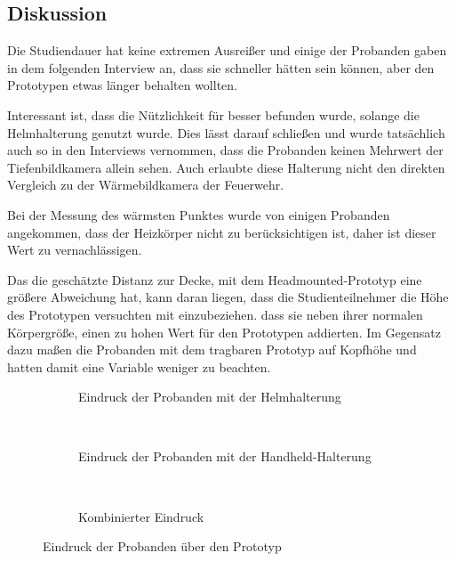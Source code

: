 \subsection{Diskussion}
Die Studiendauer hat keine extremen Ausreißer und einige der Probanden gaben in dem folgenden Interview an, dass sie schneller hätten sein können, aber den Prototypen etwas länger behalten wollten.

Interessant ist, dass die Nützlichkeit für besser befunden wurde, solange die Helmhalterung genutzt wurde.
Dies lässt darauf schließen und wurde tatsächlich auch so in den Interviews vernommen, dass die Probanden keinen Mehrwert der Tiefenbildkamera allein sehen.
Auch erlaubte diese Halterung nicht den direkten Vergleich zu der Wärmebildkamera der Feuerwehr.

Bei der Messung des wärmsten Punktes wurde von einigen Probanden angekommen, dass der Heizkörper nicht zu berücksichtigen ist, daher ist dieser Wert zu vernachlässigen.

Das die geschätzte Distanz zur Decke, mit dem Headmounted-Prototyp eine größere Abweichung hat, kann daran liegen, dass die Studienteilnehmer die Höhe des Prototypen versuchten mit einzubeziehen.
\Dh dass sie neben ihrer normalen Körpergröße, einen zu hohen Wert für den Prototypen addierten.
Im Gegensatz dazu maßen die Probanden mit dem tragbaren Prototyp auf Kopfhöhe und hatten damit eine Variable weniger zu beachten.

\begin{figure}[H]
	\centering
	\begin{subfigure}[t]{0.3\textwidth}
		\centering
		\caption{Eindruck der Probanden mit der Helmhalterung}
		\label{fig:study2_head_impres}
	\end{subfigure}
	~
	\begin{subfigure}[t]{0.3\textwidth}
		\centering
		\caption{Eindruck der Probanden mit der Handheld-Halterung}
		\label{fig:study2_hand_impres}
	\end{subfigure}
	~
	\begin{subfigure}[t]{0.3\textwidth}
		\centering
		\caption{Kombinierter Eindruck}
		\label{fig:study2_both_impres}
	\end{subfigure}
	\caption{Eindruck der Probanden über den Prototyp}
	\label{fig:study2_impres}
\end{figure}

